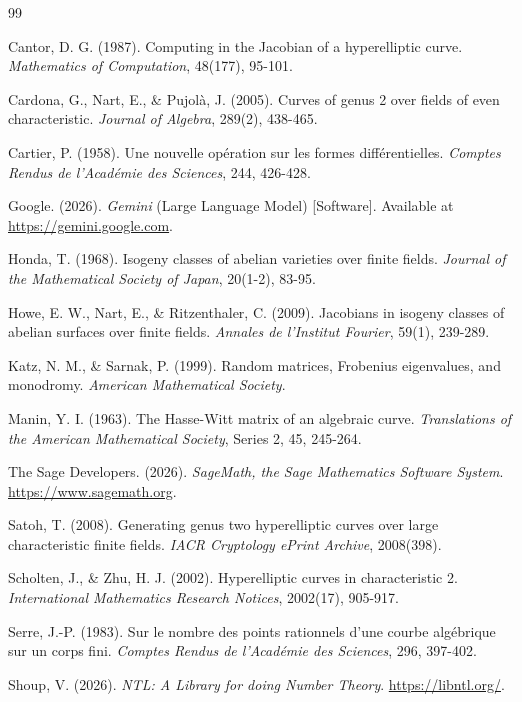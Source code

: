 \documentclass[letterpaper, 11pt]{article}
\begin{document}
\begin{thebibliography}{99}

Cantor, D. G. (1987). Computing in the Jacobian of a hyperelliptic curve. \textit{Mathematics of Computation}, 48(177), 95-101.

Cardona, G., Nart, E., \& Pujolà, J. (2005). Curves of genus 2 over fields of even characteristic. \textit{Journal of Algebra}, 289(2), 438-465.

Cartier, P. (1958). Une nouvelle op\'{e}ration sur les formes diff\'{e}rentielles. \textit{Comptes Rendus de l'Acad\'{e}mie des Sciences}, 244, 426-428.

Google. (2026). \textit{Gemini} (Large Language Model) [Software]. Available at \url{https://gemini.google.com}.

Honda, T. (1968). Isogeny classes of abelian varieties over finite fields. \textit{Journal of the Mathematical Society of Japan}, 20(1-2), 83-95.

Howe, E. W., Nart, E., \& Ritzenthaler, C. (2009). Jacobians in isogeny classes of abelian surfaces over finite fields. \textit{Annales de l'Institut Fourier}, 59(1), 239-289.

Katz, N. M., \& Sarnak, P. (1999). Random matrices, Frobenius eigenvalues, and monodromy. \textit{American Mathematical Society}.

Manin, Y. I. (1963). The Hasse-Witt matrix of an algebraic curve. \textit{Translations of the American Mathematical Society}, Series 2, 45, 245-264.

The Sage Developers. (2026). \textit{SageMath, the Sage Mathematics Software System}. \url{https://www.sagemath.org}.

Satoh, T. (2008). Generating genus two hyperelliptic curves over large characteristic finite fields. \textit{IACR Cryptology ePrint Archive}, 2008(398).

Scholten, J., \& Zhu, H. J. (2002). Hyperelliptic curves in characteristic 2. \textit{International Mathematics Research Notices}, 2002(17), 905-917.

Serre, J.-P. (1983). Sur le nombre des points rationnels d'une courbe algébrique sur un corps fini. \textit{Comptes Rendus de l'Académie des Sciences}, 296, 397-402.

Shoup, V. (2026). \textit{NTL: A Library for doing Number Theory}. \url{https://libntl.org/}.


\end{thebibliography}
\end{document}
